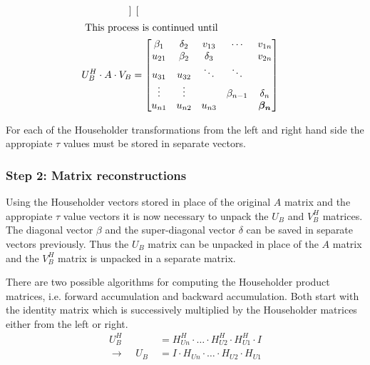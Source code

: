 \begin{align}
\begin{bmatrix}
\end{bmatrix}\\
\intertext{
This process is continued until
}
U_B^H \cdot A \cdot V_B &=
\begin{bmatrix}
\beta_1 & \delta_2 & v_{13} & \cdots & v_{1n} \\
u_{21} & \beta_2 & \delta_3 &  & v_{2n} \\
u_{31} & u_{32} & \ddots & \ddots &  \\
\vdots & \vdots & & \beta_{n-1} & \delta_n \\
u_{n1} & u_{n2} & u_{n3} &  & \boldsymbol{\beta_n} \\
\end{bmatrix}
\end{align}

For each of the Householder transformations from the left and right
hand side the appropiate $\tau$ values must be stored in separate
vectors.

\subsubsection{Step 2: Matrix reconstructions}

Using the Householder vectors stored in place of the original $A$
matrix and the appropiate $\tau$ value vectors it is now necessary to
unpack the $U_B$ and $V_B^H$ matrices.  The diagonal vector $\beta$
and the super-diagonal vector $\delta$ can be saved in separate
vectors previously.  Thus the $U_B$ matrix can be unpacked in place of
the $A$ matrix and the $V_B^H$ matrix is unpacked in a separate
matrix.

\addvspace{12pt}

There are two possible algorithms for computing the Householder
product matrices, i.e. forward accumulation and backward accumulation.
Both start with the identity matrix which is successively multiplied
by the Householder matrices either from the left or right.
\begin{align}
U_B^H &= H^H_{Un}\cdot \ldots \cdot H^H_{U2}\cdot H^H_{U1}\cdot I\\
\rightarrow\;\;\;\; U_B\; &= I\cdot H_{Un}\cdot \ldots \cdot H_{U2}\cdot H_{U1}
\end{align}

